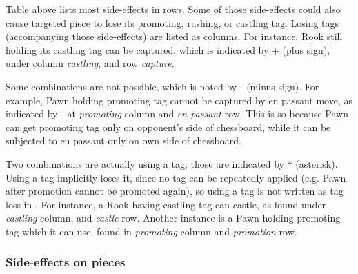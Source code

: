 Table above lists most side-effects in rows. Some of those side-effects could also cause
targeted piece to lose its promoting, rushing, or castling tag. Losing tags (accompanying
those side-effects) are listed as columns. For instance, Rook still holding its castling
tag can be captured, which is indicated by + (plus sign), under column \emph{castling},
and row \emph{capture}.

Some combinations are not possible, which is noted by - (minus sign). For example, Pawn
holding promoting tag cannot be captured by en passant move, as indicated by - at
\emph{promoting} column and \emph{en passant} row. This is so because Pawn can get
promoting tag only on opponent's side of chessboard, while it can be subjected to en passant
only on own side of chessboard.

Two combinations are actually using a tag, those are indicated by * (asterisk). Using a
tag implicitly loses it, since no tag can be repeatedly applied (e.g. Pawn after promotion
cannot be promoted again), so using a tag is not written as tag loss in . For
instance, a Rook having castling tag can castle, as found under \emph{castling} column,
and \emph{castle} row. Another instance is a Pawn holding promoting tag which it can use,
found in \emph{promoting} column and \emph{promotion} row.

\clearpage %

\subsubsection*{Side-effects on pieces}
\label{sec:Appendix/Summary/Side-effects/Side-effects on pieces}

